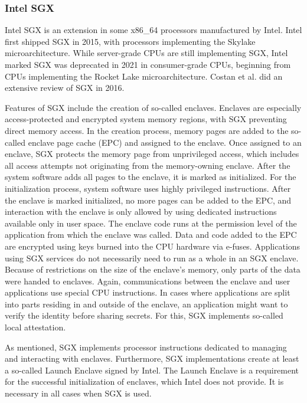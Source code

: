 \subsubsection{Intel SGX}
Intel SGX is an extension in some x86\_64 processors manufactured by Intel. Intel first shipped SGX in 2015, with
processors implementing the Skylake microarchitecture. While server-grade CPUs are still implementing SGX, Intel marked
SGX was deprecated in 2021 in consumer-grade CPUs, beginning from CPUs implementing the Rocket Lake microarchitecture.
Costan et al. did an extensive review of SGX in 2016.\cite{costan2016intel}

Features of SGX include the creation of so-called enclaves. Enclaves are especially access-protected and encrypted
system memory regions, with SGX preventing direct memory access. In the creation process, memory pages are
added to the so-called enclave page cache (EPC) and assigned to the enclave. Once assigned to an enclave, SGX protects
the memory page from unprivileged access, which includes all access attempts not originating from the memory-owning
enclave. After the system software adds all pages to the enclave, it is marked as initialized. For the initialization
process, system software uses highly privileged instructions. After the enclave is marked initialized, no more pages
can be added to the EPC, and interaction with the
enclave is only allowed by using dedicated instructions available only in user space. The enclave code runs at the
permission level of the application from which the enclave was called. Data and code added to the EPC are encrypted
using keys burned into the CPU hardware via e-fuses. Applications using SGX services do not necessarily need to run as a
whole in an SGX enclave. Because of restrictions on the size of the enclave's memory, only parts of the data were handed
to enclaves. Again, communications between the enclave and user applications use special CPU instructions. In cases where
applications are split into parts residing in and outside of the enclave, an application might want to verify the identity
before sharing secrets. For this, SGX implements so-called local attestation.

As mentioned, SGX implements processor instructions dedicated to managing and interacting with enclaves. Furthermore,
SGX implementations create at least a so-called Launch Enclave signed by Intel. The Launch Enclave is a
requirement for the successful initialization of enclaves, which Intel does not provide. It is necessary in all cases when SGX
is used.

